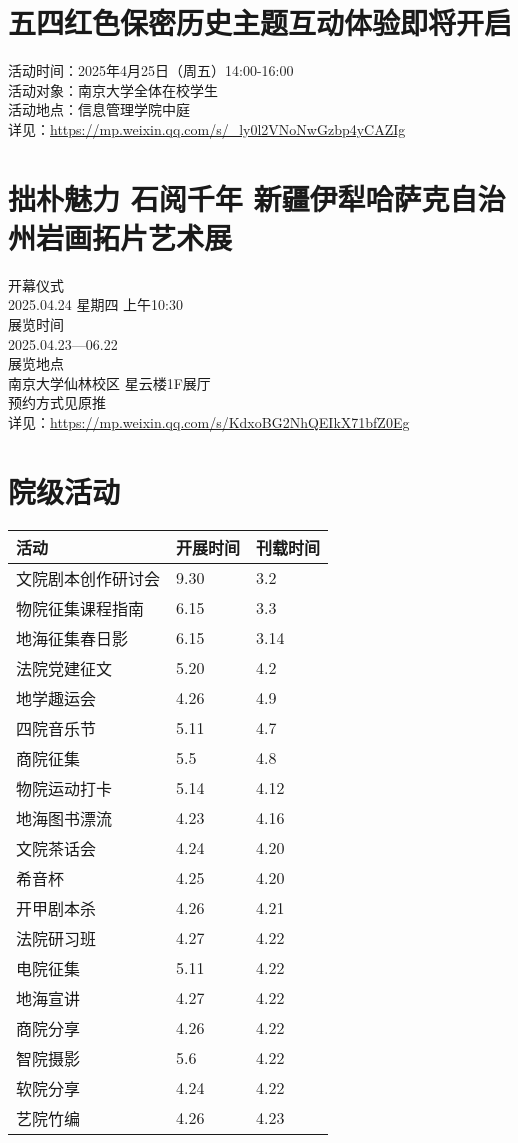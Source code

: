 \documentclass[letterpaper, 12pt]{article}
\begin{document}
\begin{multicols}{2}
\section{五四红色保密历史主题互动体验即将开启} %
活动时间：2025年4月25日（周五）14:00-16:00
\\活动对象：南京大学全体在校学生
\\活动地点：信息管理学院中庭
\\详见：\url{https://mp.weixin.qq.com/s/_ly0l2VNoNwGzbp4yCAZIg}
\section{拙朴魅力 石阅千年 新疆伊犁哈萨克自治州岩画拓片艺术展} %
开幕仪式
\\2025.04.24 星期四 上午10:30
\\展览时间
\\2025.04.23—06.22
\\展览地点
\\南京大学仙林校区 星云楼1F展厅
\\预约方式见原推
\\详见：\url{https://mp.weixin.qq.com/s/KdxoBG2NhQEIkX71bfZ0Eg}
\section{院级活动}
\begin{tabular}{|>{\centering\arraybackslash}m{}|m{}|m{}|}
\hline
    活动 & 开展时间 & 刊载时间\\
    \hline\hline
    文院剧本创作研讨会 & 9.30 & 3.2\\
    物院征集课程指南 & 6.15 & 3.3\\
    地海征集春日影 & 6.15 & 3.14\\
    法院党建征文 & 5.20 & 4.2\\
    地学趣运会 & 4.26 & 4.9\\
    四院音乐节 & 5.11 & 4.7\\
    商院征集 & 5.5 & 4.8\\
    物院运动打卡 & 5.14 & 4.12\\
    地海图书漂流 & 4.23 & 4.16\\
    文院茶话会 & 4.24 & 4.20\\
    希音杯 & 4.25 & 4.20\\
    开甲剧本杀 & 4.26 & 4.21\\
    法院研习班 & 4.27 & 4.22\\
    电院征集 & 5.11 & 4.22\\
    地海宣讲 & 4.27 & 4.22\\
    商院分享 & 4.26 & 4.22\\
    智院摄影 & 5.6 & 4.22\\
    软院分享 & 4.24 & 4.22\\
    艺院竹编 & 4.26 & 4.23\\
    \hline
\end{tabular}


\end{multicols}
\end{document}
